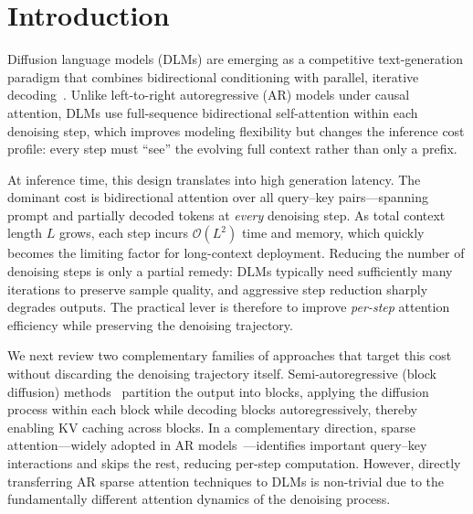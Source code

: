 \section{Introduction}

Diffusion language models (DLMs) are emerging as a competitive text-generation paradigm that combines bidirectional conditioning with parallel, iterative decoding~\citep{nie2025llada,llada2,ye2025dream}. Unlike left-to-right autoregressive (AR) models under causal attention, DLMs use full-sequence bidirectional self-attention within each denoising step, which improves modeling flexibility but changes the inference cost profile: every step must ``see'' the evolving full context rather than only a prefix.

At inference time, this design translates into high generation latency. The dominant cost is bidirectional attention over all query--key pairs---spanning prompt and partially decoded tokens at \emph{every} denoising step. As total context length $L$ grows, each step incurs $\mathcal{O}(L^2)$ time and memory, which quickly becomes the limiting factor for long-context deployment. Reducing the number of denoising steps is only a partial remedy: DLMs typically need sufficiently many iterations to preserve sample quality, and aggressive step reduction sharply degrades outputs. The practical lever is therefore to improve \emph{per-step} attention efficiency while preserving the denoising trajectory.

We next review two complementary families of approaches that target this cost without discarding the denoising trajectory itself. Semi-autoregressive (block diffusion) methods~\citep{wu2025fastdllm} partition the output into blocks, applying the diffusion process within each block while decoding blocks autoregressively, thereby enabling KV caching across blocks. In a complementary direction, sparse attention---widely adopted in AR models~\citep{jiang2024minference}---identifies important query--key interactions and skips the rest, reducing per-step computation. However, directly transferring AR sparse attention techniques to DLMs is non-trivial due to the fundamentally different attention dynamics of the denoising process.

